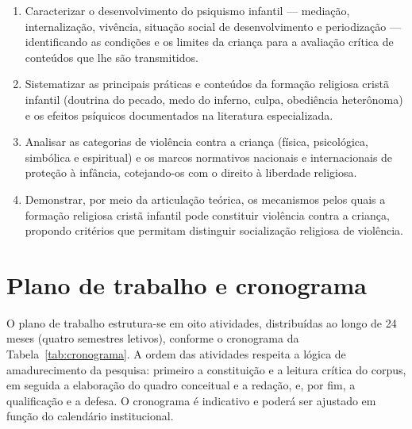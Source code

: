 \documentclass[
    a4paper,
    12pt,
    oneside,
    section=TITLE,
    brazilian,
    english
]{abntex2}
\begin{document}
\begin{enumerate}
    \item Caracterizar o desenvolvimento do psiquismo infantil --- mediação, internalização, vivência, situação social de desenvolvimento e periodização --- identificando as condições e os limites da criança para a avaliação crítica de conteúdos que lhe são transmitidos.
    \item Sistematizar as principais práticas e conteúdos da formação religiosa cristã infantil (doutrina do pecado, medo do inferno, culpa, obediência heterônoma) e os efeitos psíquicos documentados na literatura especializada.
    \item Analisar as categorias de violência contra a criança (física, psicológica, simbólica e espiritual) e os marcos normativos nacionais e internacionais de proteção à infância, cotejando-os com o direito à liberdade religiosa.
    \item Demonstrar, por meio da articulação teórica, os mecanismos pelos quais a formação religiosa cristã infantil pode constituir violência contra a criança, propondo critérios que permitam distinguir socialização religiosa de violência.
\end{enumerate}

\section{Plano de trabalho e cronograma}

O plano de trabalho estrutura-se em oito atividades, distribuídas ao longo de 24 meses (quatro semestres letivos), conforme o cronograma da Tabela~\ref{tab:cronograma}. A ordem das atividades respeita a lógica de amadurecimento da pesquisa: primeiro a constituição e a leitura crítica do corpus, em seguida a elaboração do quadro conceitual e a redação, e, por fim, a qualificação e a defesa. O cronograma é indicativo e poderá ser ajustado em função do calendário institucional.
\end{document}

